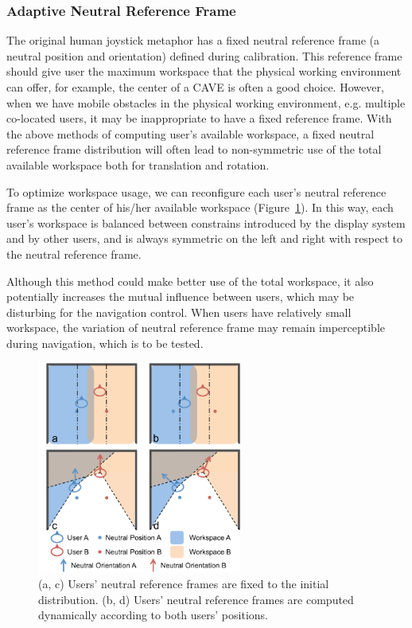 \subsubsection{Adaptive Neutral Reference Frame}

The original human joystick metaphor has a fixed neutral reference frame (a neutral position and orientation) defined during calibration. This reference frame should give user the maximum workspace that the physical working environment can offer, for example, the center of a CAVE is often a good choice. However, when we have mobile obstacles in the physical working environment, e.g. multiple co-located users, it may be inappropriate to have a fixed reference frame. With the above methods of computing user's available workspace, a fixed neutral reference frame distribution will often lead to non-symmetric use of the total available workspace both for translation and rotation.

To optimize workspace usage, we can reconfigure each user's neutral reference frame as the center of his/her available workspace (Figure~\ref{fig:4_neutral_ref}). In this way, each user's workspace is balanced between constrains introduced by the display system and by other users, and is always symmetric on the left and right with respect to the neutral reference frame.

Although this method could make better use of the total workspace, it also potentially increases the mutual influence between users, which may be disturbing for the navigation control. When users have relatively small workspace, the variation of neutral reference frame may remain imperceptible during navigation, which is to be tested.   

\begin{figure}[tb]
  \centering
  \includegraphics[width=0.6\textwidth]{figures/ch4/neutral_ref}
  \caption{\label{fig:4_neutral_ref}(a, c) Users' neutral reference frames are fixed to the initial distribution. (b, d) Users' neutral reference frames are computed dynamically according to both users' positions.}
\end{figure}

